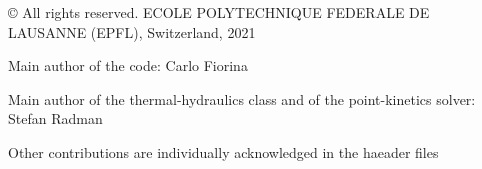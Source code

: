 © All rights reserved. E\+C\+O\+LE P\+O\+L\+Y\+T\+E\+C\+H\+N\+I\+Q\+UE F\+E\+D\+E\+R\+A\+LE DE L\+A\+U\+S\+A\+N\+NE (E\+P\+FL), Switzerland, 2021
\begin{DoxyItemize}
\item Main author of the code\+: Carlo Fiorina
\item Main author of the thermal-\/hydraulics class and of the point-\/kinetics solver\+: Stefan Radman
\item Other contributions are individually acknowledged in the haeader files 
\end{DoxyItemize}